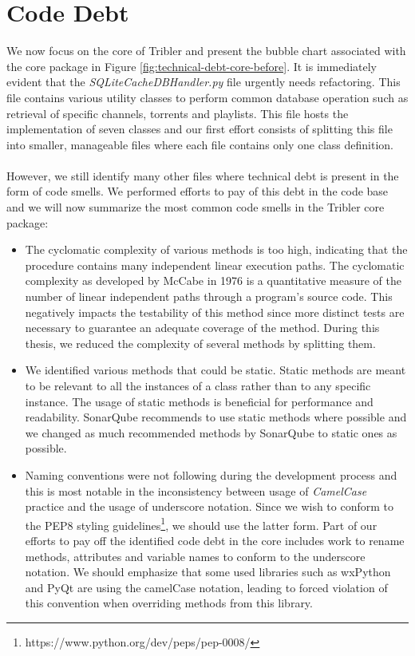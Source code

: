 \section{Code Debt}
We now focus on the core of Tribler and present the bubble chart associated with the core package in Figure \ref{fig:technical-debt-core-before}. It is immediately evident that the \emph{SQLiteCacheDBHandler.py} file urgently needs refactoring. This file contains various utility classes to perform common database operation such as retrieval of specific channels, torrents and playlists. This file hosts the implementation of seven classes and our first effort consists of splitting this file into smaller, manageable files where each file contains only one class definition.\\\\
However, we still identify many other files where technical debt is present in the form of code smells. We performed efforts to pay of this debt in the code base and we will now summarize the most common code smells in the Tribler core package:
\begin{itemize}
	\item The cyclomatic complexity of various methods is too high, indicating that the procedure contains many independent linear execution paths. The cyclomatic complexity as developed by McCabe in 1976\cite{mccabe1976complexity} is a quantitative measure of the number of linear independent paths through a program's source code. This negatively impacts the testability of this method since more distinct tests are necessary to guarantee an adequate coverage of the method. During this thesis, we reduced the complexity of several methods by splitting them.
	\item We identified various methods that could be static. Static methods are meant to be relevant to all the instances of a class rather than to any specific instance. The usage of static methods is beneficial for performance and readability. SonarQube recommends to use static methods where possible and we changed as much recommended methods by SonarQube to static ones as possible.
	\item Naming conventions were not following during the development process and this is most notable in the inconsistency between usage of \emph{CamelCase} practice and the usage of underscore notation. Since we wish to conform to the PEP8 styling guidelines\footnote{https://www.python.org/dev/peps/pep-0008/}, we should use the latter form. Part of our efforts to pay off the identified code debt in the core includes work to rename methods, attributes and variable names to conform to the underscore notation. We should emphasize that some used libraries such as wxPython and PyQt are using the camelCase notation, leading to forced violation of this convention when overriding methods from this library.
\end{itemize}

